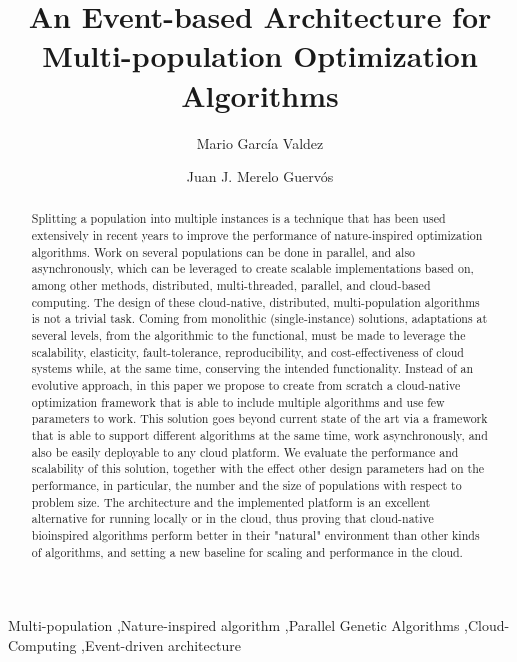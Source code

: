 \documentclass[review]{elsarticle}
\begin{document}
\begin{frontmatter}

\title{An Event-based Architecture for Multi-population Optimization Algorithms}

\author[itt]{Mario Garc\'ia Valdez}

\author[granada]{Juan J. Merelo Guerv\'os}

\address[itt]{Department of Graduate Studies, Instituto Tecnol\'ogico de Tijuana, Tijuana BC, Mexico}
\address[granada]{Universidad de Granada, Granada, Spain}

\begin{abstract} 
Splitting a population into multiple instances is a technique that has been used extensively in
recent years to improve the performance of nature-inspired optimization
algorithms. Work on several populations can be done in parallel, and
also asynchronously, which can be leveraged to create scalable
implementations based on, among other methods, distributed, multi-threaded, parallel, and cloud-based computing. 
The design of these cloud-native, distributed, multi-population
algorithms is not a trivial task. Coming from monolithic
(single-instance) solutions, adaptations at several levels, from the
algorithmic to the functional, must be made to leverage
the scalability, elasticity, fault-tolerance, reproducibility, and
cost-effectiveness of cloud systems while, at the same time,
conserving the intended functionality. Instead of an evolutive
approach, in this paper we propose to create from scratch a
cloud-native optimization framework that is able to include multiple
algorithms and use few parameters to work. This solution goes beyond
current state of the art via a framework that is able to support
different algorithms at the same time, work asynchronously, and also
be easily deployable to any cloud platform. We evaluate the
performance and scalability of this solution, together with the effect
other design parameters had on the 
performance, in particular, the number and the size of populations
with respect to problem size. The architecture and the implemented platform is an excellent
alternative for running locally or in the cloud, thus proving that cloud-native
bioinspired algorithms perform better in their "natural" environment than other
kinds of algorithms, and setting a new baseline for scaling and
performance in the cloud.
\end{abstract}

\begin{keyword}
Multi-population \sep Nature-inspired algorithm \sep Parallel Genetic Algorithms \sep Cloud-Computing
\sep Event-driven architecture 
\end{keyword}

\end{frontmatter}
\end{document}
